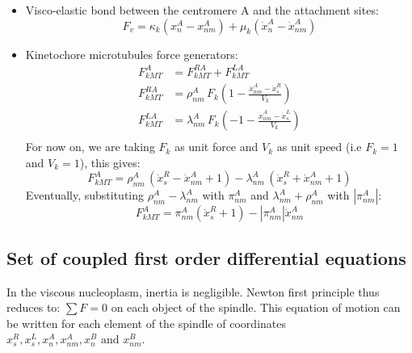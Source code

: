 \documentclass[a4paper,12pt]{article}
\begin{document}
\begin{itemize}
\item Visco-elastic bond between the centromere A and the
  attachment sites:
  $$F_v =  \kappa_k(x_n^A - x_{nm}^A) 
  + \mu_k(\dot{x}_n^A - \dot{x}_{nm}^A) $$
\item Kinetochore microtubules force generators:
  \begin{equation}
    \begin{aligned}
      F_{kMT}^A &= F_{kMT}^{RA} + F_{kMT}^{LA}\\
      F_{kMT}^{RA} &= \rho_{nm}^A\,F_k\left(1 - \frac{\dot{x}^A_{nm} -
          \dot{x}^R_s}{V_k}\right)\\
      F_{kMT}^{LA} &=  \lambda_{nm}^A\,F_k\left(-1 - \frac{\dot{x}^A_{nm} -
          \dot{x}^L_s}{V_k}\right)\\
    \end{aligned}
  \end{equation}
For now on, we are taking $F_k$ as unit force and $V_k$ as unit speed (i.e $F_k = 1$ and $ V_k = 1$), this gives:
\begin{equation}
 F_{kMT}^A = \rho_{nm}^A\,\left(\dot{x}^R_s - \dot{x}^A_{nm} + 1\right)%
 - \lambda_{nm}^A\,\left(\dot{x}^R_s + \dot{x}^A_{nm} + 1\right)
\end{equation}
Eventually, substituting $\rho^A_{nm} - \lambda^A_{nm}$ with $\pi_{nm}^A$ and $\lambda^A_{nm} + \rho^A_{nm}$ with $|\pi_{nm}^A|$:
\begin{equation}
    F_{kMT}^A =  \pi_{nm}^A(\dot{x}^R_s + 1) - |\pi_{nm}^A|\dot{x}^A_{nm}
\end{equation}
\end{itemize}

\newpage

\subsection{Set of coupled first order differential equations}

In the viscous nucleoplasm, inertia is negligible. Newton first
principle thus reduces to: $ \sum F = 0 $ on each object of the spindle. This equation of motion
can be written for each element of the spindle of coordinates $x_s^R, x_s^L, x_n^A, x_{nm}^A,  x_n^B  \mbox{ and } 
  x_{nm}^B $.
\end{document}
